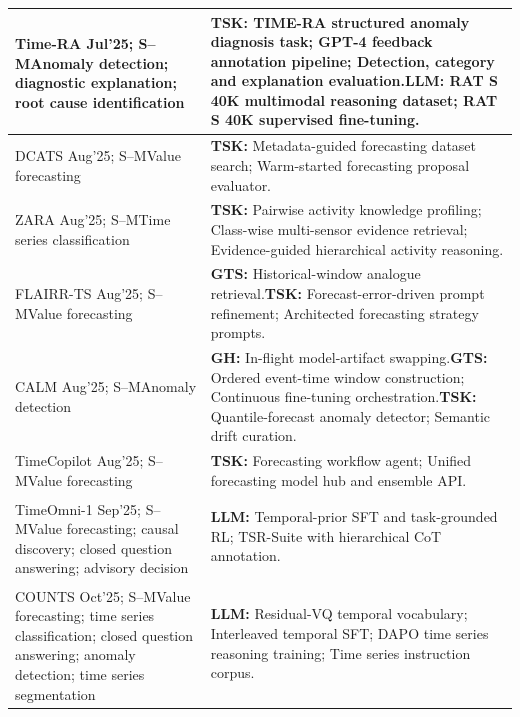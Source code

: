 \documentclass[preprints,article,submit,moreauthors]{Definitions/mdpi}
\newcommand{\typeSMshort}{\textsf{S--M}}
\newcommand{\selfclaim}{\textsuperscript{\dag}}
\begin{document}
\begin{longtable}{@{}>{\raggedright\arraybackslash}p{}p{}@{}}
Time-RA \citep{timera2025}\selfclaim{} Jul'25; \typeSMshort{}\newline Anomaly detection; diagnostic explanation; root cause identification & \textbf{TSK:} TIME-RA structured anomaly diagnosis task; GPT-4 feedback annotation pipeline; Detection, category and explanation evaluation.\newline\textbf{LLM:} RAT S 40K multimodal reasoning dataset; RAT S 40K supervised fine-tuning.\\\midrule
DCATS \citep{yeh2025empowering} Aug'25; \typeSMshort{}\newline Value forecasting & \textbf{TSK:} Metadata-guided forecasting dataset search; Warm-started forecasting proposal evaluator.\\\midrule
ZARA \citep{zara2025} Aug'25; \typeSMshort{}\newline Time series classification & \textbf{TSK:} Pairwise activity knowledge profiling; Class-wise multi-sensor evidence retrieval; Evidence-guided hierarchical activity reasoning.\\\midrule
FLAIRR-TS \citep{flairr2025} Aug'25; \typeSMshort{}\newline Value forecasting & \textbf{GTS:} Historical-window analogue retrieval.\newline\textbf{TSK:} Forecast-error-driven prompt refinement; Architected forecasting strategy prompts.\\\midrule
CALM \citep{calm2025} Aug'25; \typeSMshort{}\newline Anomaly detection & \textbf{GH:} In-flight model-artifact swapping.\newline\textbf{GTS:} Ordered event-time window construction; Continuous fine-tuning orchestration.\newline\textbf{TSK:} Quantile-forecast anomaly detector; Semantic drift curation.\\\midrule
TimeCopilot \citep{timecopilot2025} Aug'25; \typeSMshort{}\newline Value forecasting & \textbf{TSK:} Forecasting workflow agent; Unified forecasting model hub and ensemble API.\\\midrule
TimeOmni-1 \citep{timeomni2026}\selfclaim{} Sep'25; \typeSMshort{}\newline Value forecasting; causal discovery; closed question answering; advisory decision & \textbf{LLM:} Temporal-prior SFT and task-grounded RL; TSR-Suite with hierarchical CoT annotation.\\\midrule
COUNTS \citep{counts2025}\selfclaim{} Oct'25; \typeSMshort{}\newline Value forecasting; time series classification; closed question answering; anomaly detection; time series segmentation & \textbf{LLM:} Residual-VQ temporal vocabulary; Interleaved temporal SFT; DAPO time series reasoning training; Time series instruction corpus.\\\midrule

\end{longtable}
\end{document}
